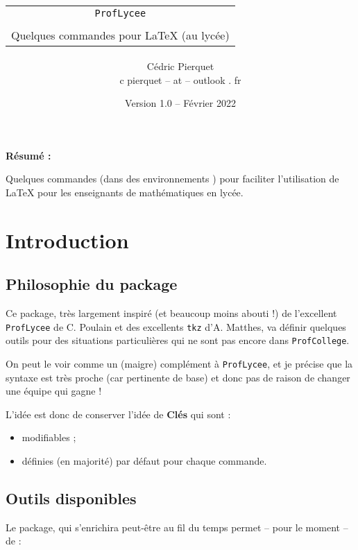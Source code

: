 \documentclass{article}
\title{%
\begin{minipage}{0.75\linewidth}
	\begin{tcolorbox}[colframe=yellow,colback=yellow!45]
		\begin{center}
			\begin{tabular}{c}
				\lstinline!ProfLycee!\\
				\\
				Quelques commandes pour  \LaTeX{} (au lycée)
			\end{tabular}
		\end{center}
	\end{tcolorbox}
\end{minipage}
}
\author{
	\begin{tabular}{c}
		Cédric {\sc Pierquet}\\
		{\ttfamily c pierquet -- at -- outlook . fr}
	\end{tabular}
}
\date{Version 1.0 -- Février 2022}
\newcommand\Cle[1]{{\bfseries\sffamily\textlangle #1\textrangle}}
\begin{document}
\thispagestyle{empty}

\maketitle

{\Large \bfseries Résumé : }

\medskip

\noindent Quelques commandes (dans des environnements \TikZ) pour faciliter l'utilisation
	de \LaTeX{} pour les enseignants de mathématiques en lycée.\\

\bigskip

\tableofcontents

\newpage

\section{Introduction}

\subsection{\og Philosophie \fg{} du package}

Ce \textsf{package}, très largement inspiré (et beaucoup moins abouti !) de l'excellent \lstinline!ProfLycee! de C. Poulain et des excellents \lstinline!tkz! d'A. Matthes, va définir quelques outils pour des situations particulières qui ne sont pas encore dans \lstinline!ProfCollege!.

On peut le voir comme un (maigre) complément à \lstinline!ProfLycee!, et je précise que la syntaxe est très proche (car pertinente de base) et donc pas de raison de changer une équipe qui gagne !

\medskip

L'idée est donc de conserver l'idée de \Cle{Clés} qui sont :
%
\begin{itemize}
	\item modifiables ;
	\item définies (en majorité) par défaut pour chaque commande.
\end{itemize}

\subsection{Outils disponibles}

Le \textsf{package}, qui s'enrichira peut-être au fil du temps permet -- pour le moment -- de :
\end{document}
